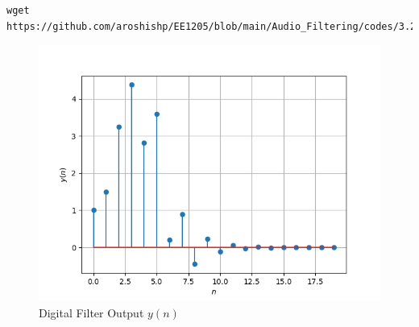 \documentclass[journal,12pt,twocolumn]{IEEEtran}
\theoremstyle{remark}
\renewcommand\thesection{\arabic{section}}
\numberwithin{equation}{subsection}
\begin{document}
\begin{enumerate}[label=\thesection.\arabic*,ref=\thesection.\theenumi]
\begin{lstlisting}
wget https://github.com/aroshishp/EE1205/blob/main/Audio_Filtering/codes/3.2.py
\end{lstlisting}
\begin{figure}[!h]
\begin{center}
\includegraphics[width=\columnwidth]{figs/3.2.png}
\end{center}
\caption{Digital Filter Output $y(n)$}
\label{fig:y_n}	
\end{figure}

\end{enumerate}
\end{document}
